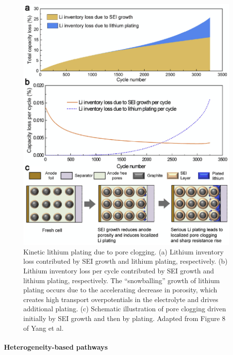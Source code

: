 \documentclass[journal=jpcl, manuscript=article, layout=onecolumn]{achemso}
\begin{document}
\begin{figure}[h]
    \centering
    \includegraphics[scale=0.9]{figures/li_plating_porosity_yang.eps}
    \caption{Kinetic lithium plating due to pore clogging. (a) Lithium inventory loss contributed by SEI growth and lithium plating, respectively. (b) Lithium inventory loss per cycle contributed by SEI growth and lithium plating, respectively. The ``snowballing'' growth of lithium plating occurs due to the accelerating decrease in porosity, which creates high transport overpotentials in the electrolyte and drives additional plating. (c) Schematic illustration of pore clogging driven initially by SEI growth and then by plating. Adapted from Figure 8 of Yang et al.\cite{yang_modeling_2017}}
    \label{fig:pore_clogging}
\end{figure}

\paragraph{Heterogeneity-based pathways}
\end{document}

